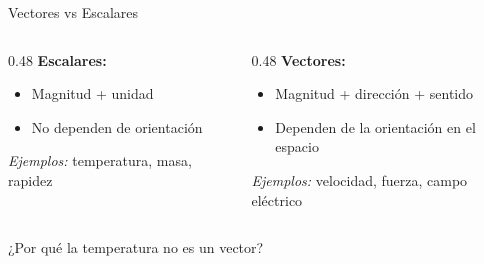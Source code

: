 \documentclass[aspectratio=169,xcolor=dvipsnames]{beamer}
\begin{document}
\begin{frame}{Vectores vs Escalares}
	\begin{columns}[T]
		\begin{column}{0.48\textwidth}
			\textbf{Escalares:}
			\begin{itemize}
				\item Magnitud + unidad
				\item No dependen de orientación
			\end{itemize}
			\vspace{0.2cm}
			\textit{Ejemplos:} temperatura, masa, rapidez
		\end{column}
		\begin{column}{0.48\textwidth}
			\textbf{Vectores:}
			\begin{itemize}
				\item Magnitud + dirección + sentido
				\item Dependen de la orientación en el espacio
			\end{itemize}
			\vspace{0.2cm}
			\textit{Ejemplos:} velocidad, fuerza, campo eléctrico
		\end{column}
	\end{columns}
	
	\vspace{0.3cm}
	\begin{center}
		\alert{¿Por qué la temperatura no es un vector?}
	\end{center}
\end{frame}
\end{document}
